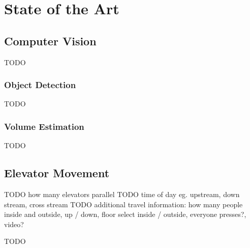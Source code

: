 \chapter{State of the Art}
\label{chap:sota}

\section{Computer Vision}

TODO

\subsection{Object Detection}

TODO

\subsection{Volume Estimation}

TODO

\section{Elevator Movement}
TODO how many elevators parallel
TODO time of day eg. upstream, down stream, cross stream
TODO additional travel information: how many people inside and outside, up / down, floor select inside / outside, everyone presses?, video?  


TODO
